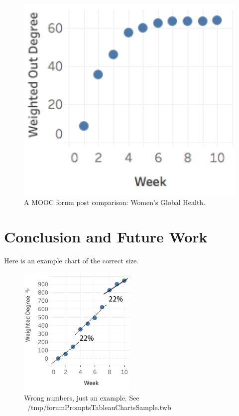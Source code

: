 \begin{figure}[htp]
       \centering
       \includegraphics[width=1\textwidth]{Figs/women_health_summer2015_top10.png}
       \caption{\textnormal{A MOOC forum post comparison: Women's
           Global Health.}}
       \label{fig:womenHealth}
\end{figure}


\section{Conclusion and Future Work}

Here is an example chart of the correct size.
\begin{figure}[htp]
       \centering
       \includegraphics[width=0.5\textwidth]{Figs/exampleChart1.png}
       \caption{\textnormal{Wrong numbers, just an example. See ~/tmp/forumPromptsTableauChartsSample.twb}}
       \label{fig:exampleChart}
\end{figure}


